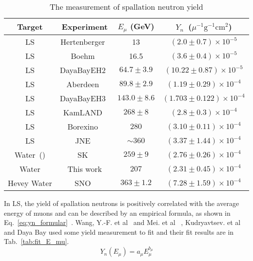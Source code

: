 \begin{table}[htbp]
	\centering
	\caption{The measurement of spallation neutron yield}
	\label{tab:syn_summary}
	\begin{tabular}{cccc}
		\toprule
		Target          & Experiment                            & $E_{\mu}$ (\si{GeV}) & $Y_n$~($\mu^{-1}\mathrm{g}^{-1}\mathrm{cm}^{2}$) \\
		\midrule
		LS              & Hertenberger~\cite{spnYn_hertenberge} & 13                   & $(2.0 \pm 0.7) \times 10^{-5}$                   \\
		LS              & Boehm~\cite{spnYn_Boehm}              & 16.5                 & $(3.6 \pm 0.4) \times 10^{-5}$                   \\
		LS              & DayaBayEH2~\cite{spnYn_Daya_bay}      & $64.7\pm3.9$         & $(10.22 \pm 0.87) \times 10^{-5}$                \\
		LS              & Aberdeen~\cite{spnYn_Aberdeen}        & $89.8\pm2.9$         & $(1.19 \pm 0.29) \times 10^{-4}$                 \\
		LS              & DayaBayEH3~\cite{spnYn_Daya_bay}      & $143.0\pm8.6$        & $(1.703 \pm0.122) \times 10^{-4}$                \\
		LS              & KamLAND~\cite{spnYn_KamLAND}          & $268\pm8$            & $(2.8 \pm 0.3) \times 10^{-4}$                   \\
		LS              & Borexino~\cite{spnYn_Borexino}        & $280$                & $(3.10 \pm 0.11) \times 10^{-4}$                 \\
		LS              & JNE~\cite{spnYn_JNE}                  & $\sim 360$           & $(3.37 \pm 1.44) \times 10^{-4}$                 \\
		Water~(\ce{Gd}) & SK~\cite{SK_spnYn}                    & $259\pm9$            & $(2.76 \pm 0.26) \times 10^{-4}$                 \\
		Water           & This work                             & $207$                & $(2.31 \pm 0.45) \times 10^{-4}$                 \\
		Hevey Water     & SNO~\cite{sno_spnYn}                  & $363\pm1.2$          & $(7.28 \pm 1.59) \times 10^{-4}$                 \\
		\bottomrule
	\end{tabular}
\end{table}

In LS, the yield of spallation neutrons is positively correlated with the average energy of muons and can be described by an empirical formula, as shown in Eq.~\eqref{eq:yn_formular}~\cite{spnYn_Boehm,Predict_LS_Wang,Formuler_1,Predict_LS_Mei}. Wang, Y.-F. et al~\cite{Predict_LS_Wang} and Mei. et al~\cite{Predict_LS_Mei} , Kudryavtsev. et al~\cite{Kudryavtsev} and Daya Bay\cite{spnYn_Daya_bay} used some yield measurement to fit and their fit results are in Tab.~\ref{tab:fit_E_mu}.
\begin{equation}
	\label{eq:yn_formular}
	Y_n(E_{\mu}) = a_{\mu}E_{\mu}^{b_{\mu}}
\end{equation}

